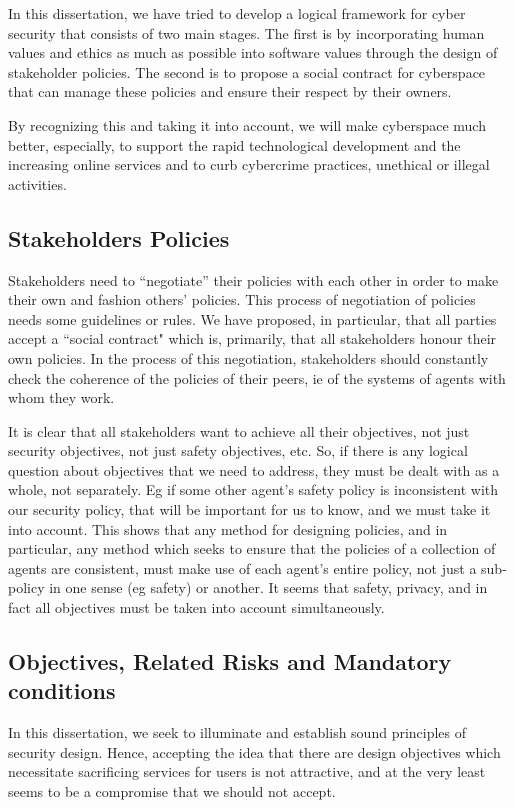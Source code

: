In this dissertation, we have tried to develop a logical framework for cyber security that consists of two main stages. The first is by incorporating  human values and ethics as much as possible into software values through the design of stakeholder policies. The second is to propose a social contract for cyberspace that can manage these policies and ensure their respect by their owners.

By recognizing this and taking it into account, we will make cyberspace much better, especially,  to support the rapid technological development and the increasing online services and to curb cybercrime practices, unethical or illegal activities.

\subsection{Stakeholders Policies}
Stakeholders need to ``negotiate'' their policies with each other in
order to make their own and fashion others' policies. This process of
negotiation of policies needs some guidelines or rules. We have proposed,
in particular, that all parties accept a ``social contract" which is,
primarily, that all stakeholders honour their own policies. In the
process of this negotiation, stakeholders should constantly check the
coherence of the policies of their peers, ie of the systems of agents
with whom they work.

It is clear that all stakeholders want to achieve all their objectives,
not just security objectives, not just safety objectives, etc. So, if
there is any logical question about objectives that we need to address,
they must be dealt with as a whole, not separately. Eg if some other
agent's safety policy is inconsistent with our security policy, that will
be important for us to know, and we must take it into account. This
shows that any method for designing policies, and in particular,
any method which seeks to ensure that the policies of a collection of
agents are consistent, must make use of each agent's entire policy,
not just a sub-policy in one sense (eg safety) or another. It seems
that safety, privacy, and in fact all objectives must be taken into
account simultaneously.

\subsection{Objectives, Related Risks and Mandatory conditions}
In this dissertation,  we seek to illuminate and establish sound principles of security design. Hence, accepting the idea that there are design objectives which necessitate sacrificing services for users is not attractive, and at the very least seems to be a compromise that we should not accept.


